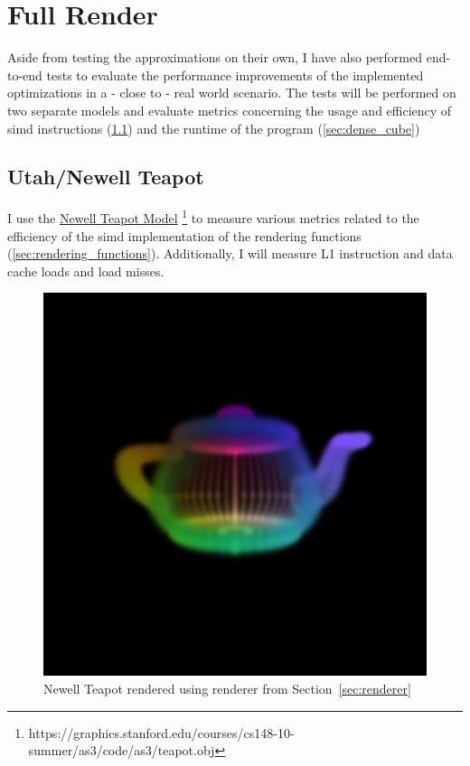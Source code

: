 \documentclass[a4paper, 11pt]{memoir}
\begin{document}

    \section{Full Render}
    Aside from testing the approximations on their own, I have also performed end-to-end tests
    to evaluate the performance improvements of the implemented optimizations in a - close to - real world scenario.
    The tests will be performed on two separate models and evaluate metrics concerning the usage and efficiency of
    \gls{simd} instructions (\ref{sec:utah_teapot}) and the runtime of the program (\ref{sec:dense_cube})

    \subsection{Utah/Newell Teapot}
    \label{sec:utah_teapot}
    I use the \href{https://graphics.stanford.edu/courses/cs148-10-summer/as3/code/as3/teapot.obj}{Newell Teapot Model}
    \footnote{https://graphics.stanford.edu/courses/cs148-10-summer/as3/code/as3/teapot.obj} to measure various metrics
    related to the efficiency of the \gls{simd} implementation of the rendering functions (\ref{sec:rendering_functions}).
    Additionally, I will measure L1 instruction and data cache loads and load misses.

    \begin{figure}[t]
        \centering
        \includegraphics[scale=.2]{images/teapot.png}
        \caption{Newell Teapot rendered using renderer from Section~\ref{sec:renderer}}
        \label{fig:teapot_render}
    \end{figure}
    
\end{document}
